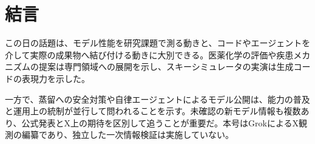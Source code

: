 \section{結言}
この日の話題は、モデル性能を研究課題で測る動きと、コードやエージェントを介して実際の成果物へ結び付ける動きに大別できる。医薬化学の評価や疾患メカニズムの提案は専門領域への展開を示し、スキーシミュレータの実演は生成コードの表現力を示した。

一方で、蒸留への安全対策や自律エージェントによるモデル公開は、能力の普及と運用上の統制が並行して問われることを示す。未確認の新モデル情報も複数あり、公式発表とX上の期待を区別して追うことが重要だ。本号はGrokによるX観測の編纂であり、独立した一次情報検証は実施していない。
